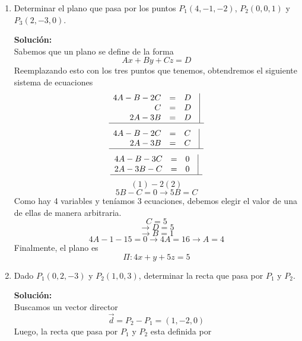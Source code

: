 \documentclass[12pt]{article}
\newenvironment{solucion}
{\begin{mdframed}[backgroundcolor=black!10]
		{\bf Solución:}\\
	}
	{
	\end{mdframed}
}
\newenvironment{preguntas}
{\begin{enumerate}\itemsep12pt
	}
	{
	\end{enumerate}
}
\newcommand{\ra}{\rightarrow}
\begin{document}
\begin{preguntas}
\begin{solucion}
\begin{enumerate}[a)]
$$\begin{pmatrix}
			\end{pmatrix} \times
			\begin{pmatrix}
			-3\\
			8\\
			-11
			\end{pmatrix} = i(-55 -80) - j (-22 +30) +k(16 + 15) = \begin{pmatrix}
			-135\\
			-8\\
			31
			\end{pmatrix}$$
			Como este no es el vector nulo, tampoco son paralelos. Con esto concluimos que ambos vectores son oblicuos.
\end{enumerate}
\end{solucion}
\item Determinar el plano que pasa por los puntos $P_1(4,-1,-2)$, $P_2(0,0,1)$ y $P_3(2,-3,0)$.
\begin{solucion}
Sabemos que un plano se define de la forma
		$$Ax +By + Cz = D$$
		Reemplazando esto con los tres puntos que tenemos, obtendremos el siguiente sistema de ecuaciones
		$$
		\begin{array}{rcrr}
		4A-B-2C & = & D& \vline\\
		C & = & D & \vline\\
		2A-3B & = & D &\vline\\
		\hline
		\end{array}
		$$
		$$
		\begin{array}{rcrr}
		4A-B-2C & = & C& \vline\\
		2A-3B & = & C &\vline\\
		\hline
		\end{array}
		$$
		$$
		\begin{array}{rcrr}
		4A-B-3C & = & 0& \vline\\
		2A-3B -C& = & 0 &\vline\\
		\hline
		\end{array}
		$$
		$$(1) - 2(2)$$
		$$5B - C = 0 \ra 5B = C$$
		Como hay 4 variables y teníamos 3 ecuaciones, debemos elegir el valor de una de ellas de manera arbitraria.
		$$C = 5$$
		$$\ra D = 5$$
		$$\ra B = 1$$
		$$4A -1 -15 = 0 \ra 4A=16 \ra A=4$$
		Finalmente, el plano es
		$$\Pi:4x + y + 5z = 5$$
\end{solucion}
\item Dado $P_1(0,2,-3)$ y $P_2(1,0,3)$, determinar la recta que pasa por $P_1$ y $P_2$.
\begin{solucion}
Buscamos un vector director
		$$\vec{d} = P_2 - P_1 = (1, -2, 0)$$
		Luego, la recta que pasa por $P_1$ y $P_2$ esta definida por

\end{solucion}
\end{preguntas}
\end{document}
